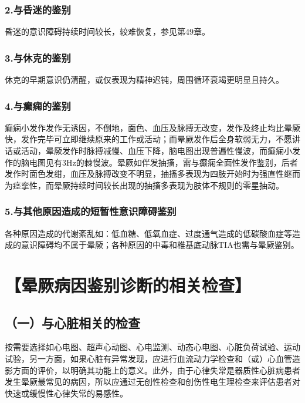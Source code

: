 \subsubsection{2.与昏迷的鉴别}

昏迷的意识障碍持续时间较长，较难恢复，参见第49章。

\subsubsection{3.与休克的鉴别}

休克的早期意识仍清醒，或仅表现为精神迟钝，周围循环衰竭更明显且持久。

\subsubsection{4.与癫痫的鉴别}

癫痫小发作发作无诱因，不倒地，面色、血压及脉搏无改变，发作及终止均比晕厥快，发作完毕可立即继续原来的工作或活动；而晕厥发作后全身软弱无力，不愿讲话或活动，晕厥发作时脉搏减慢、血压下降，脑电图出现普遍性慢波，而癫痫小发作的脑电图见有3Hz的棘慢波。晕厥如伴发抽搐，需与癫痫全面性发作鉴别，后者发作时面色发绀，血压及脉搏改变不明显，抽搐多表现为四肢开始时为强直性继而为痉挛性，而晕厥持续时间较长出现的抽搐多表现为肢体不规则的零星抽动。

\subsubsection{5.与其他原因造成的短暂性意识障碍鉴别}

各种原因造成的代谢紊乱如：低血糖、低氧血症、过度通气造成的低碳酸血症等造成的意识障碍均不属于晕厥；各种原因的中毒和椎基底动脉TIA也需与晕厥鉴别。

\section{【晕厥病因鉴别诊断的相关检查】}

\subsection{（一）与心脏相关的检查}

按需要选择如心电图、超声心动图、心电监测、动态心电图、心脏负荷试验、运动试验，另一方面，如果心脏有异常发现，应进行血流动力学检查和（或）心血管造影方面的评价，以明确其功能上的意义。此外，由于心律失常是器质性心脏病患者发生晕厥最常见的病因，所以应通过无创性检查和创伤性电生理检查来评估患者对快速或缓慢性心律失常的易感性。

